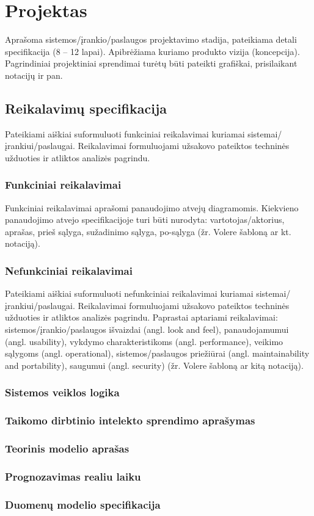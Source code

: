 \section{Projektas}
Aprašoma sistemos/įrankio/paslaugos projektavimo stadija, pateikiama detali
specifikacija (8 – 12 lapai). Apibrėžiama kuriamo produkto vizija (koncepcija).
Pagrindiniai projektiniai sprendimai turėtų būti pateikti grafiškai,
prisilaikant notacijų ir pan. \subsection{Reikalavimų specifikacija} Pateikiami
aiškiai suformuluoti
funkciniai reikalavimai kuriamai sistemai/įrankiui/paslaugai. Reikalavimai
formuluojami užsakovo pateiktos techninės užduoties ir atliktos analizės
pagrindu.
\subsubsection{Funkciniai reikalavimai}
Funkciniai reikalavimai aprašomi panaudojimo atvejų diagramomis. Kiekvieno
panaudojimo atvejo specifikacijoje turi būti nurodyta: vartotojas/aktorius,
aprašas, prieš sąlyga, sužadinimo sąlyga, po-sąlyga (žr. Volere šabloną ar kt.
notaciją). \subsubsection{Nefunkciniai reikalavimai} Pateikiami aiškiai
suformuluoti
nefunkciniai reikalavimai kuriamai sistemai/įrankiui/paslaugai. Reikalavimai
formuluojami užsakovo pateiktos techninės užduoties ir atliktos analizės
pagrindu. Paprastai aptariami reikalavimai: sistemos/įrankio/paslaugos
išvaizdai (angl. look and feel), panaudojamumui (angl. usability), vykdymo
charakteristikoms (angl. performance), veikimo sąlygoms (angl. operational),
sistemos/paslaugos priežiūrai (angl. maintainability and portability), saugumui
(angl. security) (žr. Volere šabloną ar kitą notaciją).
\subsubsection{Sistemos veiklos logika}
\subsubsection{Taikomo dirbtinio intelekto sprendimo aprašymas}
\subsubsection{Teorinis modelio aprašas}
\subsubsection{Prognozavimas realiu laiku}
\subsubsection{Duomenų modelio specifikacija}
